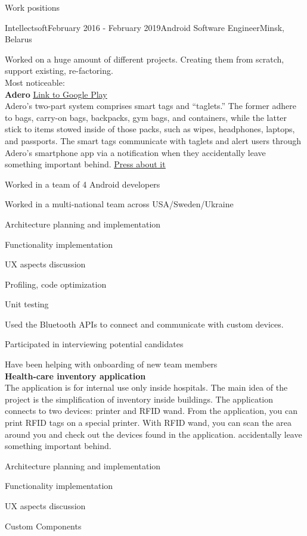 \documentclass{resume} %
\begin{document}
\begin{rSection}{Work positions}
\begin{rSubsection}{Intellectsoft}{February 2016 - February 2019}{Android Software Engineer}{Minsk, Belarus}
\item[] Worked on a huge amount of different projects. Creating them from scratch, support existing, re-factoring. \smallskip \\
Most noticeable:\smallskip \\
\textbf{Adero}  \hfill\underline{\href{https://play.google.com/store/apps/details?id=com.adero.app}{Link to Google Play}}\\
Adero’s two-part system comprises smart tags and “taglets.” The former adhere to bags, carry-on bags, backpacks, gym bags, and containers, while the latter stick to items stowed inside of those packs, such as wipes, headphones, laptops, and passports. The smart tags communicate with taglets and alert users through Adero’s smartphone app via a notification when they accidentally leave something important behind. \textbf\hfill\underline{\href{https://venturebeat.com/ai/adero-formerly-trackr-launches-new-smart-tag-system-with-proactive-notifications/}{Press about it}}
\item Worked in a team of 4 Android developers
\item Worked in a multi-national team across USA/Sweden/Ukraine
\item Architecture planning and implementation
\item Functionality implementation
\item UX aspects discussion
\item Profiling, code optimization
\item Unit testing
\item Used the Bluetooth APIs to connect and communicate with custom devices. 
\item Participated in interviewing potential candidates
\item Have been helping with onboarding of new team members\\
\textbf{Health-care inventory application}\\
The application is for internal use only inside hospitals. The main idea of the project is the simplification of inventory inside buildings. The application connects to two devices: printer and RFID wand. From the application, you can print RFID tags on a special printer. With RFID wand, you can scan the area around you and check out the devices found in the application. accidentally leave something important behind.
\item Architecture planning and implementation
\item Functionality implementation
\item UX aspects discussion
\item Custom Components



\end{rSubsection}
\end{rSection}
\end{document}
